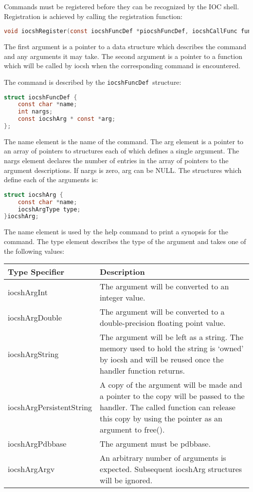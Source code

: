 Commands must be registered before they can be recognized by the IOC shell.
Registration is achieved by calling the registration function:

\begin{lstlisting}[language=C]
void iocshRegister(const iocshFuncDef *piocshFuncDef, iocshCallFunc func);
\end{lstlisting}

The first argument is a pointer to a data structure which describes the command and any arguments it may take.
The second argument is a pointer to a function which will be called by iocsh when the corresponding command is encountered.

The command is described by the  \verb|iocshFuncDef |structure:

\begin{lstlisting}[language=C]
struct iocshFuncDef {
    const char *name;
    int nargs;
    const iocshArg * const *arg;
};
\end{lstlisting}

The name element is the name of the command.
The arg element is a pointer to an array of pointers to structures each of which defines a single argument.
The nargs element declares the number of entries in the array of pointers to the argument descriptions.
If nargs is zero, arg can be NULL.
The structures which define each of the arguments is:

\begin{lstlisting}[language=C]
struct iocshArg {
    const char *name;
    iocshArgType type;
}iocshArg;
\end{lstlisting}

The name element is used by the help command to print a synopsis for the command.
The type element describes the type of the argument and takes one of the following values:

\begin{center}
\begin{longtable}
{p{1.5in}p{3.76in}}
Type Specifier & Description\\
\hline
iocshArgInt & The argument will be converted to an integer value.\\
iocshArgDouble & The argument will be converted to a double-precision floating point value.\\
iocshArgString & The argument will be left as a string.  The memory used to hold the string is `owned' by iocsh and will be reused once the handler function returns.\\
iocshArgPersistentString & A copy of the argument will be made and a pointer to the copy will be passed to the handler.  The called function can release this copy by using the pointer as an argument to free().\\
iocshArgPdbbase & The argument must be pdbbase.\\
iocshArgArgv & An arbitrary number of arguments is expected.  Subsequent iocshArg structures will be ignored.
\end{longtable}
\end{center}


